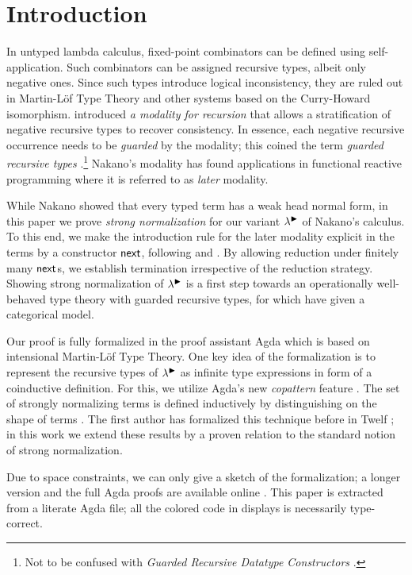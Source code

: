 
\section{Introduction}
\label{sec:intro}

In untyped lambda calculus, fixed-point combinators can be defined
using self-app\-li\-ca\-tion.  Such combinators can be assigned recursive
types, albeit only negative ones.  Since such types introduce logical
inconsistency, they are ruled out in Martin-L\"of
Type Theory and other systems based on the Curry-Howard isomorphism.
\citet{nakano:lics00} introduced \emph{a modality for recursion} that
allows a stratification of negative recursive types to recover
consistency.  In essence, each negative recursive occurrence needs to
be \emph{guarded} by the modality; this coined the term \emph{guarded
  recursive types} \citep{birkedalMogelberg:lics13}.\footnote{Not to
  be confused with \emph{Guarded Recursive Datatype Constructors}
  \citep{xiChenChen:popl03}.} 
Nakano's modality has found applications in functional reactive
programming \citep{krishnaswamiBenton:lics11} where it is referred to
as \emph{later} modality.

While Nakano showed that every typed term has a weak head normal form,
in this paper we prove \emph{strong normalization} for our variant
$\lambda^{\mathord{\blacktriangleright}}$ of Nakano's calculus.  
To this end, we
make the introduction rule for the later modality explicit in the
terms by a constructor $\mathsf{next}$, following
\citet{birkedalMogelberg:lics13} and \citet{atkeyMcBride:icfp13}.  By
allowing reduction under finitely many $\mathsf{next}$s, we establish
termination irrespective of the reduction strategy.  
%
Showing strong normalization of $\lambda^{\mathord{\blacktriangleright}}$ is a first step towards
an operationally well-behaved type theory with guarded recursive types, for
which \citet{birkedalMogelberg:lics13} have given a categorical model.

Our proof is fully formalized in the proof assistant Agda
\citeyearpar{agda24} which is based on intensional Martin-L\"of Type Theory.
One key idea of the formalization is to represent the recursive types
of $\lambda^{\mathord{\blacktriangleright}}$ as infinite type expressions in form of a
coinductive definition.  For this, we utilize Agda's new
\emph{copattern} feature \citep{abelPientkaThibodeauSetzer:popl13}.  
The set of strongly normalizing terms is defined inductively by
distinguishing on the shape of terms
\citep{raamsdonk:perpetualReductions,matthes:shortproofs}.  The first author has
formalized this technique before in Twelf \citep{abel:entcs04};
in this work we extend these results by a  
proven relation to the standard notion of strong normalization. 

Due to space constraints, we can only give a sketch of the
formalization; a longer version and
the full Agda proofs 
are available online
\citep{abelVezzosi:guardedNormalization}.
This paper is extracted from a literate Agda file; all the colored
code in displays is necessarily type-correct.

